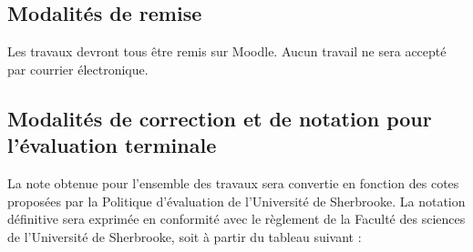\documentclass[12]{article}
\begin{document}
    \subsection*{Modalités de remise}

	Les travaux devront tous être remis sur Moodle. Aucun travail ne sera
	accepté par courrier électronique.

	\subsection*{Modalités de correction et de notation pour l'évaluation terminale}

	La note obtenue pour l’ensemble des travaux sera convertie en fonction des
	cotes proposées par la Politique d’évaluation de l’Université de Sherbrooke.
	La notation définitive sera exprimée en conformité avec le règlement de la
	Faculté des sciences de l’Université de Sherbrooke, soit à partir du tableau
	suivant :
	
\end{document}
